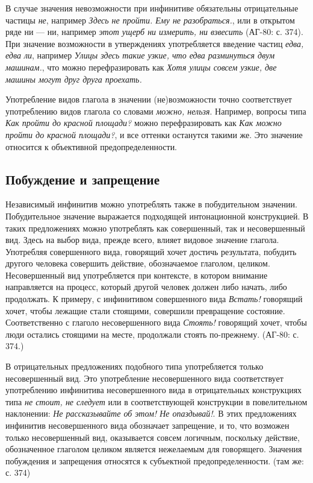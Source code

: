 В случае значения невозможности при инфинитиве обязательны отрицательные частицы \textit{не}, например \textit{Здесь не пройти. Ему не разобраться.}, или в открытом ряде ни --- ни, например \textit{этот ущерб ни измерить, ни взвесить} (АГ-80: с. 374). При значение возможности в утверждениях употребляется введение частиц \textit{едва, едва ли}, например \textit{Улицы здесь такие узкие, что едва разминуться двум машинам.}, что можно перефразировать как \textit{Хотя улицы совсем узкие, две машины могут друг друга проехать.} 

Употребление видов глагола в значении (не)возможности точно соответствует употреблению видов глагола со словами \textit{можно, нельзя}. Например, вопросы типа \textit{Как пройти до красной площади?} можно перефразировать как \textit{Как можно пройти до красной площади?}, и все оттенки останутся такими же. Это значение относится к объективной предопределенности.

\subsection{Побуждение и запрещение}

Независимый инфинитив можно употреблять также в побудительном значении. Побудительное значение выражается подходящей интонационной конструкцией. В таких предложениях можно употреблять как совершенный, так и несовершенный вид. Здесь на выбор вида, прежде всего, влияет видовое значение глагола. Употребляя совершенного вида, говорящий хочет достичь результата, побудить другого человека совершить действие, обозначаемое глаголом, целиком. Несовершенный вид употребляется при контексте, в котором внимание направляется на процесс, который другой человек должен либо начать, либо продолжать. К примеру, с инфинитивом совершенного вида \textit{Встать!} говорящий хочет, чтобы лежащие стали стоящими, совершили превращение состояние. Соответственно с глаголо несовершенного вида \textit{Стоять!} говорящий хочет, чтобы люди остались стоящими на месте, продолжали стоять по-прежнему. (АГ-80: с. 374.) 

В отрицательных предложениях подобного типа употребляется только несовершенный вид. Это употребление несовершенного вида соответствует употреблению инфинитива несовершенного вида в отрицательных конструкциях типа \textit{не стоит, не следует} или в соответствующей конструкции в повелительном наклонении: \textit{Не рассказывайте об этом! Не опаздывай!}. В этих предложениях инфинитив несовершенного вида обозначает запрещение, и то, что возможен только несовершенный вид, оказывается совсем логичным, поскольку действие, обозначенное глаголом целиком является нежелаемым для говорящего. Значения побуждения и запрещения относятся к субъектной предопределенности. (там же: с. 374)

